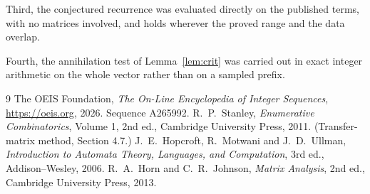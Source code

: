 \documentclass[11pt,a4paper]{article}
\theoremstyle{plain}
\theoremstyle{definition}
\begin{document}
Third, the conjectured recurrence was evaluated directly on the published terms, with no
matrices involved, and holds wherever the proved range and the data overlap.

Fourth, the annihilation test of Lemma~\ref{lem:crit} was carried out in exact integer
arithmetic on the whole vector rather than on a sampled prefix.

\begin{thebibliography}{9}
 The OEIS Foundation, \emph{The On-Line Encyclopedia of Integer
Sequences}, \url{https://oeis.org}, 2026. Sequence A265992.
 R.~P.~Stanley, \emph{Enumerative Combinatorics}, Volume 1, 2nd ed.,
Cambridge University Press, 2011. (Transfer-matrix method, Section 4.7.)
 J.~E.~Hopcroft, R.~Motwani and J.~D.~Ullman, \emph{Introduction to Automata
Theory, Languages, and Computation}, 3rd ed., Addison--Wesley, 2006.
 R.~A.~Horn and C.~R.~Johnson, \emph{Matrix Analysis}, 2nd ed., Cambridge
University Press, 2013.
\end{thebibliography}
\end{document}
